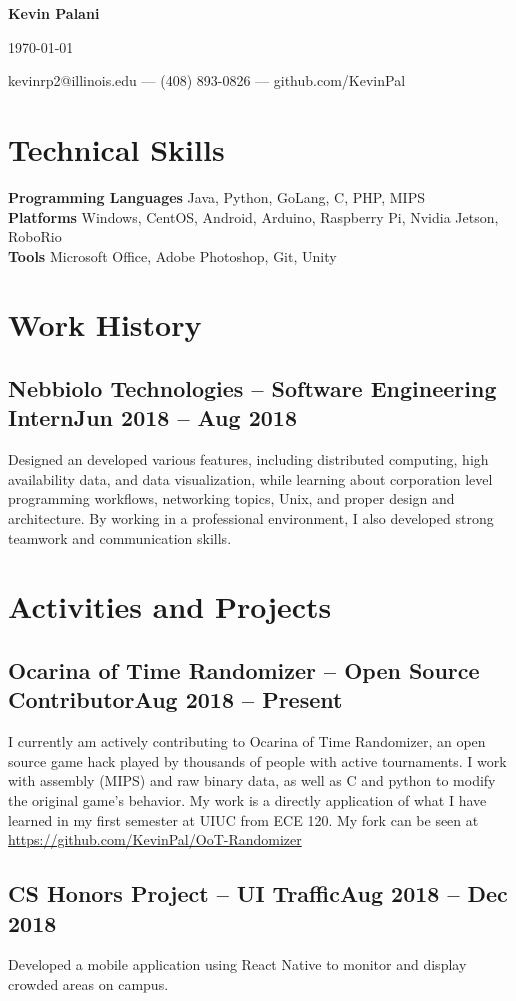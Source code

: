\documentclass[letterpaper,12pt]{article}
\makeatletter
\newcommand\textbox[1]{%
	\parbox{.333\textwidth}{#1}%
}
\renewcommand{\maketitle}{
	\begin{center}
		\noindent\textbox{\hfill}\textbox{\hfil\bfseries\huge Kevin Palani\hfil}\textbox{\hfill \today}
		{kevinrp2@illinois.edu --- (408) 893-0826 --- github.com/KevinPal}
	\end{center} }
\makeatother
\begin{document}
\maketitle
\section{Technical Skills}
{\bfseries Programming Languages} Java, Python, GoLang, C, PHP, MIPS\\
{\bfseries Platforms} Windows, CentOS, Android, Arduino, Raspberry Pi, Nvidia Jetson, RoboRio\\
{\bfseries Tools} Microsoft Office, Adobe Photoshop, Git, Unity
\vspace*{-2mm}
\section{Work History}
\subsection{Nebbiolo Technologies -- Software Engineering Intern\null\hfill Jun 2018 -- Aug 2018}
Designed an developed various features, including distributed computing, high availability data, and data visualization, while learning about corporation level programming workflows, networking topics, Unix, and proper design and architecture.
By working in a professional environment, I also developed strong teamwork and communication skills.
\vspace*{-2mm}
\section{Activities and Projects}
\subsection{Ocarina of Time Randomizer -- Open Source Contributor\null\hfill Aug 2018 -- Present}
I currently am actively contributing to Ocarina of Time Randomizer, an open source game hack played by thousands of people with active tournaments. I work with assembly (MIPS) and raw binary data, as well as C and python to modify the original game's behavior.
My work is a directly application of what I have learned in my first semester at UIUC from ECE 120.
My fork can be seen at \\\underline{https://github.com/KevinPal/OoT-Randomizer}
\vspace*{-2mm}
\subsection{CS Honors Project -- UI Traffic\null\hfill Aug 2018 -- Dec 2018}
Developed a mobile application using React Native to monitor and display crowded areas on campus.
\vspace*{-2mm}
\end{document}
